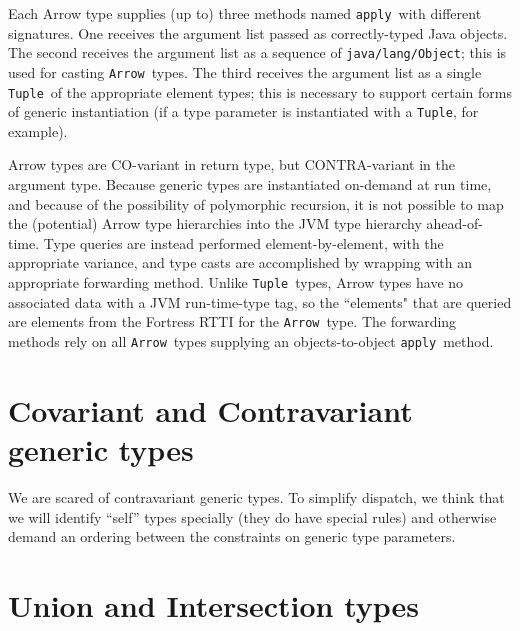 \documentclass[11pt]{article}
\newcommand{\jvm}[1]{{\tt #1}}
\begin{document}
Each Arrow type supplies (up to) three methods named \jvm{apply}\ with different signatures.  One receives the argument list passed as correctly-typed Java objects.  The second receives the argument list as a sequence of \verb+java/lang/Object+; this is used for casting \jvm{Arrow}\ types.  The third receives the argument list as a single \jvm{Tuple}\ of the appropriate element types; this is necessary to support certain forms of generic instantiation (if a type parameter is instantiated with a \jvm{Tuple}, for example).

Arrow types are CO-variant in return type, but CONTRA-variant in the argument type.  Because generic types are instantiated on-demand at run time, and because of the possibility of polymorphic recursion, it is not possible to map the (potential) Arrow type hierarchies into the JVM type hierarchy ahead-of-time.  Type queries are instead performed element-by-element, with the appropriate variance, and type casts are accomplished by wrapping with an appropriate forwarding method.  Unlike \jvm{Tuple}\ types, Arrow types have no associated data with a JVM run-time-type tag, so the ``elements" that are queried are elements from the Fortress RTTI for the \jvm{Arrow}\ type.  The forwarding methods rely on all \jvm{Arrow}\ types supplying an objects-to-object \jvm{apply}\ method.

\section{Covariant and Contravariant generic types}

We are scared of contravariant generic types.  To simplify dispatch, we think that we will identify ``self'' types specially (they do have special rules) and otherwise demand an ordering between the constraints on generic type parameters.  

\section{Union and Intersection types}
\end{document}
